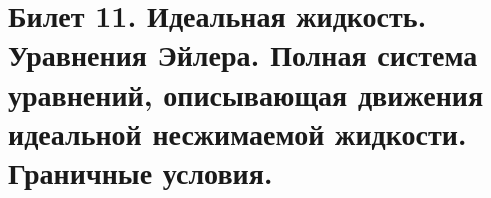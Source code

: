\newpage
\section{Билет 11. Идеальная жидкость. Уравнения Эйлера. Полная система уравнений, описывающая движения идеальной несжимаемой жидкости. Граничные условия.}